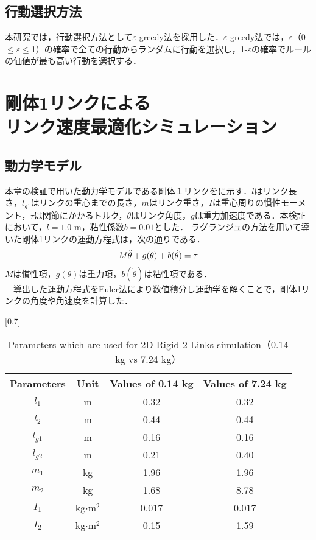 \begin{small}
\subsection{行動選択方法}
本研究では，行動選択方法として$\varepsilon$-greedy法\cite{greedy}を採用した．$\varepsilon$-greedy法では，$\varepsilon$（0$\leq$$\varepsilon$$\leq$1）の確率で全ての行動からランダムに行動を選択し，1-$\varepsilon$の確率でルールの価値が最も高い行動を選択する．\\
\section{剛体1リンクによる\\リンク速度最適化シミュレーション}
\subsection{動力学モデル}
本章の検証で用いた動力学モデルである剛体１リンクをに示す．$l$はリンク長さ，$l_{g1}$はリンクの重心までの長さ，$m$はリンク重さ，$I$は重心周りの慣性モーメント，$\tau$は関節にかかるトルク，$\theta$はリンク角度，$g$は重力加速度である．本検証において，$l=1.0$ m，粘性係数$b=0.01$とした．
ラグランジュの方法\cite{lagrange}を用いて導いた剛体1リンクの運動方程式は，次の通りである．
\begin{eqnarray}
  \equlabel{2}
  M\ddot{\theta} + g(\theta) + b(\dot{\theta}) = \tau
\end{eqnarray}
$M$は慣性項，$g(\theta)$は重力項，$b(\dot{\theta})$は粘性項である．\\
　導出した運動方程式をEuler法\cite{euler}により数値積分し運動学を解くことで，剛体1リンクの角度や角速度を計算した．
\begin{table}[t]
  \begin{center}
    \caption{Parameters which are used for 2D Rigid 2 Links simulation（0.14 kg vs 7.24 kg）}
    \scalebox{0.7}[0.7]{
    \begin{tabular}{c|c|c|c}
      \hline
      Parameters & Unit & Values of 0.14 kg & Values of 7.24 kg \\
      \hline
      $l_{1}$ & m & 0.32 & 0.32\\
      $l_{2}$ & m & 0.44 & 0.44\\
      $l_{g1}$ & m & 0.16 & 0.16 \\
      $l_{g2}$ & m & 0.21 & 0.40 \\
      $m_{1}$ & kg & 1.96 & 1.96\\
      $m_{2}$ & kg & 1.68 & 8.78 \\
      $I_{1}$ & kg$\cdot$$\mathrm{m}^2$ & 0.017 & 0.017 \\
      $I_{2}$ & kg$\cdot$$\mathrm{m}^2$ & 0.15 & 1.59 \\
      \hline
    \end{tabular}
    }
  \end{center}
\end{table}

\end{small}
